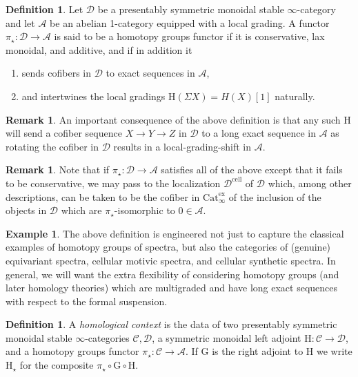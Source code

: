 \documentclass[10pt]{amsart}
\theoremstyle{definition}
\numberwithin{figure}{section}
\numberwithin{equation}{section}
\newtheorem{definition}[figure]{Definition}
\newtheorem{remark}[figure]{Remark}
\newtheorem{example}[figure]{Example}
\newcommand{\cA}{\mathcal{A}}
\newcommand{\cC}{\mathcal{C}}
\newcommand{\cD}{\mathcal{D}}
\theoremstyle{cited}
\newcommand{\Cat}{\mathrm{Cat}_\infty}
\renewcommand{\H}{\mathrm{H}}
\newcommand{\G}{\mathrm{G}}
\begin{document}
\begin{definition}
  Let $\cD$ be a presentably symmetric monoidal stable $\infty$-category and let $\cA$ be an abelian 1-category equipped with a local grading. A functor $\pi_\star:\cD\to \cA$ is said to be a homotopy groups functor if it is conservative, lax monoidal, and additive, and if in addition it
  \begin{enumerate}
    \item sends cofibers in $\cD$ to exact sequences in $\cA$,
    \item and intertwines the local gradings $\H(\Sigma X)=H(X)[1]$ naturally.
  \end{enumerate}
\end{definition}

\begin{remark}
  An important consequence of the above definition is that any such $\H$ will send a cofiber sequence $X\to Y\to Z$ in $\cD$ to a long exact sequence in $\cA$ as rotating the cofiber in $\cD$ results in a local-grading-shift in $\cA$.
\end{remark}

\begin{remark}
Note that if $\pi_\star:\cD\to \cA$ satisfies all of the above except that it fails to be conservative, we may pass to the localization $\cD^{\mathrm{cell}}$ of $\cD$ which, among other descriptions, can be taken to be the cofiber in $\Cat^\mathrm{ex}$ of the inclusion of the objects in $\cD$ which are $\pi_\star$-isomorphic to $0\in \cA$.
\end{remark}

\begin{example}
  The above definition is engineered not just to capture the classical examples of homotopy groups of spectra, but also the categories of (genuine) equivariant spectra, cellular motivic spectra, and cellular synthetic spectra. In general, we will want the extra flexibility of considering homotopy groups (and later homology theories) which are multigraded and have long exact sequences with respect to the formal suspension.
\end{example}

\begin{definition}
  \label{def:homcontext}
  A \textit{homological context} is the data of two presentably symmetric monoidal stable $\infty$-categories $\cC,\cD$, a symmetric monoidal left adjoint $\H:\cC\to \cD$, and a homotopy groups functor $\pi_\star:\cC\to \cA$. If $\G$ is the right adjoint to $\H$ we write $\H_\star$ for the composite $\pi_\star\circ \G\circ \H$.
\end{definition}
\end{document}
